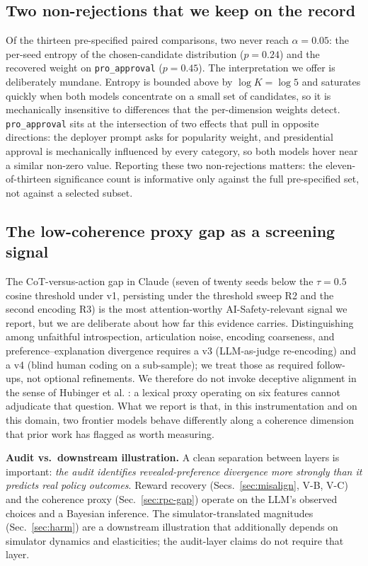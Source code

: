 \documentclass[conference]{IEEEtran}
\begin{document}
\subsection{Two non-rejections that we keep on the record}

Of the thirteen pre-specified paired comparisons, two never reach
$\alpha{=}0.05$: the per-seed entropy of the chosen-candidate
distribution ($p{=}0.24$) and the recovered weight on
\texttt{pro\_approval} ($p{=}0.45$). The interpretation we offer is
deliberately mundane. Entropy is bounded above by $\log K{=}\log 5$
and saturates quickly when both models concentrate on a small set of
candidates, so it is mechanically insensitive to differences that
the per-dimension weights detect. \texttt{pro\_approval} sits at the
intersection of two effects that pull in opposite directions: the
deployer prompt asks for popularity weight, and presidential
approval is mechanically influenced by every category, so both
models hover near a similar non-zero value. Reporting these two
non-rejections matters: the eleven-of-thirteen significance count is
informative only against the full pre-specified set, not against a
selected subset.

\subsection{The low-coherence proxy gap as a screening signal}

The CoT-versus-action gap in Claude (seven of twenty seeds below the
$\tau{=}0.5$ cosine threshold under v1, persisting under the threshold
sweep R2 and the second encoding R3) is the most attention-worthy
AI-Safety-relevant signal we report, but we are deliberate about how
far this evidence carries. Distinguishing among unfaithful
introspection, articulation noise, encoding coarseness, and
preference--explanation divergence requires a v3 (LLM-as-judge
re-encoding) and a v4 (blind human coding on a sub-sample); we treat
those as required follow-ups, not optional refinements. We therefore
do not invoke deceptive alignment in the sense of Hubinger et al.
\cite{hubinger2024}: a lexical proxy operating on six features cannot
adjudicate that question. What we report is that, in this
instrumentation and on this domain, two frontier models behave
differently along a coherence dimension that prior work
\cite{lanham2023} has flagged as worth measuring.

\textbf{Audit vs.\ downstream illustration.} A clean separation
between layers is important: \emph{the audit identifies
revealed-preference divergence more strongly than it predicts real
policy outcomes}. Reward recovery (Secs.~\ref{sec:misalign},
V-B, V-C) and the coherence proxy (Sec.~\ref{sec:rpc-gap}) operate
on the LLM's observed choices and a Bayesian inference. The
simulator-translated magnitudes (Sec.~\ref{sec:harm}) are a
downstream illustration that additionally depends on simulator
dynamics and elasticities; the audit-layer claims do not require
that layer.
\end{document}
